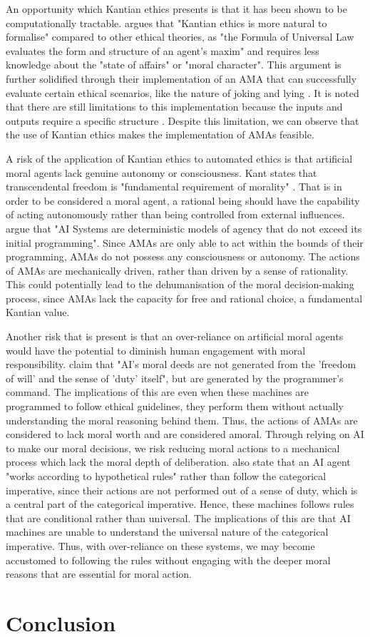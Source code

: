\documentclass{article}
\begin{document}
An opportunity which Kantian ethics presents is that it has been shown to be computationally
tractable. \textcite[p. 16]{singh2022} argues that "Kantian ethics is more natural to formalise" compared
to other ethical theories, as "the Formula of Universal Law evaluates the form and structure of an agent's
maxim" and requires less knowledge about the "state of affairs" or "moral character". This argument is 
further solidified through their implementation of an AMA that can successfully evaluate certain
ethical scenarios, like the nature of joking and lying \parencite[6--7]{singh2022}. It is noted that
there are still limitations to this implementation because the inputs and outputs require a specific
structure \parencite[p. 10]{singh2022}. Despite this limitation, we can observe that the use of Kantian
ethics makes the implementation of AMAs feasible.

A risk of the application of Kantian ethics to automated ethics is that artificial moral agents lack
genuine autonomy or consciousness. Kant states that transcendental freedom is "fundamental requirement of morality"
\parencite[p. 142]{mannananth2021}. That is in order to be considered a moral agent, a rational being should 
have the capability of acting autonomously rather than being controlled from external influences. \textcite[p. 149]{mannananth2021}
argue that "AI Systems are deterministic models of agency that do not exceed its initial programming". Since AMAs are
only able to act within the bounds of their programming, AMAs do not possess any consciousness or autonomy. The actions
of AMAs are mechanically driven, rather than driven by a sense of rationality. This could potentially lead to the
dehumanisation of the moral decision-making process, since AMAs lack the capacity for free and rational choice, a fundamental
Kantian value.

Another risk that is present is that an over-reliance on artificial moral agents would have the potential to diminish human engagement
with moral responsibility. \textcite[p. 146]{mannananth2021} claim that "AI's moral deeds are not generated from
the 'freedom of will' and the sense of 'duty' itself", but are generated by the programmer's command. The 
implications of this are even when these machines are programmed to follow ethical guidelines, they perform
them without actually understanding the moral reasoning behind them. Thus, the actions of AMAs are considered to
lack moral worth and are considered amoral. Through relying on AI to make our moral decisions, we risk reducing moral
actions to a mechanical process which lack the moral depth of deliberation. \textcite[p. 148]{mannananth2021} also state
that an AI agent "works according to hypothetical rules" rather than follow the categorical imperative, since their
actions are not performed out of a sense of duty, which is a central part of the categorical imperative. Hence, these
machines follows rules that are conditional rather than universal. The implications of this are that AI machines are
unable to understand the universal nature of the categorical imperative. Thus, with over-reliance on these systems,
we may become accustomed to following the rules without engaging with the deeper moral reasons that are essential for moral
action. 

\section{Conclusion}
\printbibliography[title={References}]
\end{document}
